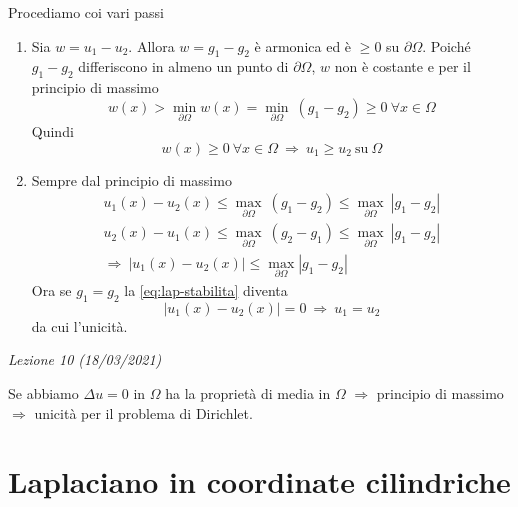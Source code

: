 \documentclass[10pt,a4paper,twoside,openright]{book}
\begin{document}
\begin{dimostrazione}
	Procediamo coi vari passi
	\begin{enumerate}
		\item Sia $\displaystyle w=u_{1} -u_{2}$. Allora $\displaystyle w=g_{1} -g_{2}$ è armonica ed è $\displaystyle \geqslant 0$ su $\displaystyle \partial \Omega $. Poiché $\displaystyle g_{1} -g_{2}$ differiscono in almeno un punto di $\displaystyle \partial \Omega $, $\displaystyle w$ non è costante e per il principio di massimo
		      \begin{equation*}
		      	w(x)  >\min_{\partial \Omega } w(x) =\min_{\partial \Omega } \ (g_{1} -g_{2}) \geqslant 0\ \forall x\in \Omega 
		      \end{equation*}
		      Quindi
		      \begin{equation*}
		      	w(x) \geqslant 0\ \forall x\in \Omega \ \Rightarrow \ u_{1} \geqslant u_{2} \ \mathrm{su} \ \Omega 
		      \end{equation*}
		\item Sempre dal principio di massimo
		      \begin{gather*}
		      	u_{1}(x) -u_{2}(x) \leqslant \max_{\partial \Omega } \ (g_{1} -g_{2}) \leqslant \max_{\partial \Omega } \ | g_{1} -g_{2}| \\
		      	u_{2}(x) -u_{1}(x) \leqslant \max_{\partial \Omega } \ (g_{2} -g_{1}) \leqslant \max_{\partial \Omega } \ | g_{1} -g_{2}| \\
		      	\Rightarrow \ | u_{1}(x) -u_{2}(x)| \leqslant \max_{\partial \Omega }| g_{1} -g_{2}| 
		      \end{gather*}
		      Ora se $\displaystyle g_{1} =g_{2}$ la \eqref{eq:lap-stabilita} diventa 
		      \begin{equation*}
		      	| u_{1}(x) -u_{2}(x)| =0\ \Rightarrow \ u_{1} =u_{2}
		      \end{equation*}
		      da cui l'unicità.
	\end{enumerate}
\end{dimostrazione}
\textit{Lezione 10 (18/03/2021)}

Se abbiamo $\Delta u=0$ in $\Omega $ ha la proprietà di media in $\Omega $ $\Rightarrow $ principio di massimo $\Rightarrow $ unicità per il problema di Dirichlet.
\section{Laplaciano in coordinate cilindriche}
\end{document}
